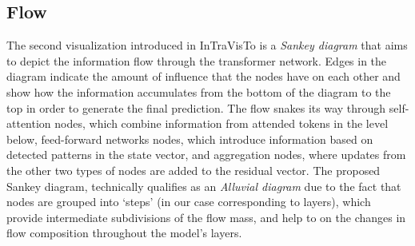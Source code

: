 \subsection{Flow}\label{ssec:method_intravisto_flow}

The second visualization introduced in InTraVisTo is a \emph{Sankey diagram} that aims to depict the information flow through the transformer network.
Edges in the diagram indicate the amount of influence that the nodes have on each other and show how the information accumulates from the bottom of the diagram to the top in order to generate the final prediction.
The flow snakes its way through self-attention nodes, which combine information from attended tokens in the level below, feed-forward networks nodes, which introduce information based on detected patterns in the state vector, and aggregation nodes, where updates from the other two types of nodes are added to the residual vector.
The proposed Sankey diagram, technically qualifies as an \emph{Alluvial diagram} due to the fact that nodes are grouped into `steps' (in our case corresponding to layers), which provide intermediate subdivisions of the flow mass, and help to  on the changes in flow composition throughout the model's layers.

